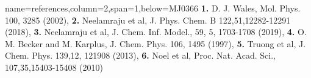 \documentclass[a0paper,portrait]{baposter}
\begin{document}
\begin{poster}
{name=references,column=2,span=1,below=MJ0366}{
\Small
\renewcommand*{\bibfont}{\footnotesize}
\renewcommand*{\bibfont}{\footnotesize}
\bibfont{\textbf{1.} D. J. Wales, Mol. Phys. 100, 3285 (2002),} 
\bibfont{\textbf{2.} Neelamraju et al, J. Phys. Chem. B 122,51,12282-12291 (2018),} 
\bibfont{\textbf{3.} Neelamraju et al, J. Chem. Inf.  Model., 59, 5, 1703-1708 (2019),}
\bibfont{\textbf{4.} O. M. Becker and M. Karplus, J. Chem. Phys. 106, 1495 (1997),}
\bibfont{\textbf{5.} Truong et al, J. Chem. Phys. 139,12, 121908 (2013), \textbf{6.} Noel et al, Proc. Nat. Acad. Sci., 107,35,15403-15408 (2010)}
}
% 
% 



\end{poster}
\end{document}
